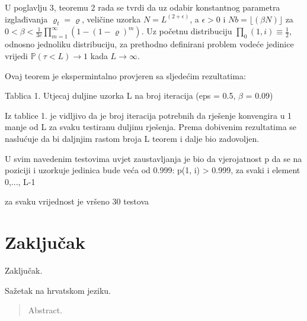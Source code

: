 \documentclass[times, utf8, zavrsni]{fer}
\newcommand{\floor}[1]{\lfloor #1 \rfloor}
\begin{document}
U poglavlju 3, teoremu 2 rada \citep{zijun2014asymptotic} se tvrdi da uz odabir konstantnog parametra izglađivanja $\varrho_t = \varrho$, veličine uzorka $N = L^{(2 + \epsilon)}$, a $\epsilon > 0$ i
$Nb =  \floor{(\beta N)}$ za $0 < \beta < \frac{1}{3e} \prod^{\infty}_{m=1} (1 - (1 - \varrho)^m)$. Uz početnu distribuciju
$\prod_0(1, i) \equiv \frac{1}{2}$, odnosno jednoliku distribuciju, za prethodno definirani
problem vodeće jedinice vrijedi $\mathbb{P}(\tau < L) \rightarrow 1$ kada $L \rightarrow \infty$.

Ovaj teorem je ekspermintalno provjeren sa sljedećim rezultatima:

Tablica 1. Utjecaj duljine uzorka L na broj iteracija (eps = 0.5, $\beta$ = 0.09)

Iz tablice 1. je vidljivo da je broj iteracija potrebnih da rješenje konvengira u 1 manje od L za svaku testiranu duljinu rješenja. Prema dobivenim rezultatima
se naslućuje da bi daljnjim rastom broja L teorem i dalje bio zadovoljen.







U svim navedenim testovima uvjet zaustavljanja je bio da vjerojatnost p da se na poziciji i uzorkuje jedinica bude veća od 0.999:
p(1, i) > 0.999, za svaki  i element {0,..., L-1}




za svaku vrijednost je vršeno 30 testova


\chapter{Zaključak}
Zaključak.




\begin{sazetak}
Sažetak na hrvatskom jeziku.

\end{sazetak}

\begin{abstract}
Abstract.

\end{abstract}
\end{document}
